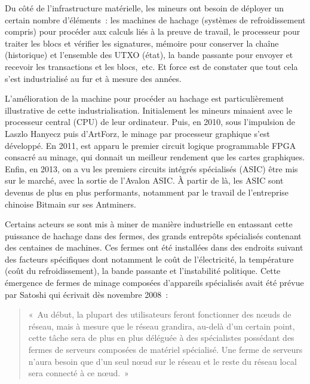Du côté de l'infrastructure matérielle, les mineurs ont besoin de déployer un certain nombre d'éléments~: les machines de hachage (systèmes de refroidissement compris) pour procéder aux calculs liés à la preuve de travail, le processeur pour traiter les blocs et vérifier les signatures, mémoire pour conserver la chaîne (historique) et l'ensemble des UTXO (état), la bande passante pour envoyer et recevoir les transactions et les blocs,~etc. Et force est de constater que tout cela s'est industrialisé au fur et à mesure des années.


L'amélioration de la machine pour procéder au hachage est particulièrement illustrative de cette industrialisation. Initialement les mineurs minaient avec le processeur central (CPU) de leur ordinateur. Puis, en 2010, sous l'impulsion de Laszlo Hanyecz puis d'ArtForz, le minage par processeur graphique s'est développé. En 2011, est apparu le premier circuit logique programmable FPGA consacré au minage, qui donnait un meilleur rendement que les cartes graphiques. Enfin, en 2013, on a vu les premiers circuits intégrés spécialisés (ASIC) être mis sur le marché, avec la sortie de l'Avalon ASIC. À partir de là, les ASIC sont devenus de plus en plus performants, notamment par le travail de l'entreprise chinoise Bitmain sur ses Antminers.


Certains acteurs se sont mis à miner de manière industrielle en entassant cette puissance de hachage dans des fermes, des grands entrepôts spécialisés contenant des centaines de machines. Ces fermes ont été installées dans des endroits suivant des facteurs spécifiques dont notamment le coût de l'électricité, la température (coût du refroidissement), la bande passante et l'instabilité politique. Cette émergence de fermes de minage composées d'appareils spécialisés avait été prévue par Satoshi qui écrivait dès novembre 2008~:

\begin{quote}
«~Au début, la plupart des utilisateurs feront fonctionner des nœuds de réseau, mais à mesure que le réseau grandira, au-delà d'un certain point, cette tâche sera de plus en plus déléguée à des spécialistes possédant des fermes de serveurs composées de matériel spécialisé. Une ferme de serveurs n'aura besoin que d'un seul nœud sur le réseau et le reste du réseau local sera connecté à ce nœud.~»
\end{quote}

